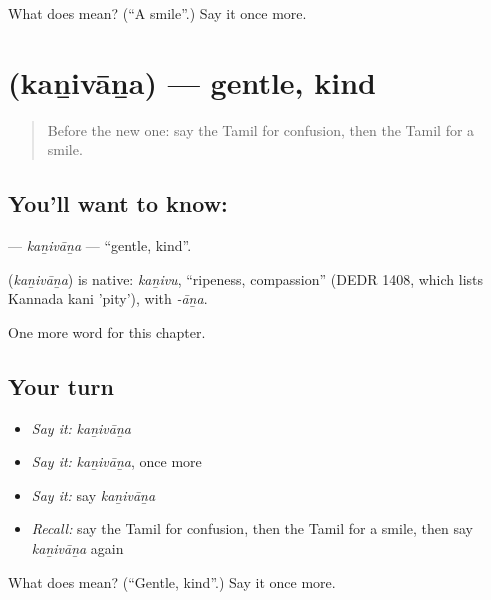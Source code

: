 \begin{tcolorbox}[breakable,colback=teal!4,colframe=teal!35!black,title={Before you move on}]
What does  mean? (\textquotedblleft{}A smile\textquotedblright{}.) Say it once more.
\end{tcolorbox}
\section[\texorpdfstring{\ta{கனிவான} (kaṉivāṉa)}{கனிவான (kaṉivāṉa)}]{ (kaṉivāṉa) — gentle, kind}

\label{lesson:TA-C268-kanivana}



\begin{quote}
Before the new one: say the Tamil for confusion, then the Tamil for a smile.
\end{quote}

\subsection*{You'll want to know: }
\textbf{} — \emph{kaṉivāṉa} — \textquotedblleft{}gentle, kind\textquotedblright{}.

\begin{cousinweb}
\textbf{} (\emph{kaṉivāṉa}) is native: \emph{kaṉivu}, \textquotedblleft{}ripeness, compassion\textquotedblright{} (DEDR 1408, which lists Kannada kani 'pity'), with \emph{-āṉa}.
\end{cousinweb}

\begin{grammarlens}[title={What you've built}]
One more word for this chapter.
\end{grammarlens}

\subsection*{Your turn}
\begin{itemize}
\raggedright
  \item \emph{Say it:} \emph{kaṉivāṉa}
  \item \emph{Say it:} \emph{kaṉivāṉa}, once more
  \item \emph{Say it:} say \emph{kaṉivāṉa}
  \item \emph{Recall:} say the Tamil for confusion, then the Tamil for a smile, then say \emph{kaṉivāṉa} again
\end{itemize}

\begin{tcolorbox}[breakable,colback=teal!4,colframe=teal!35!black,title={Before you move on}]
What does  mean? (\textquotedblleft{}Gentle, kind\textquotedblright{}.) Say it once more.
\end{tcolorbox}
